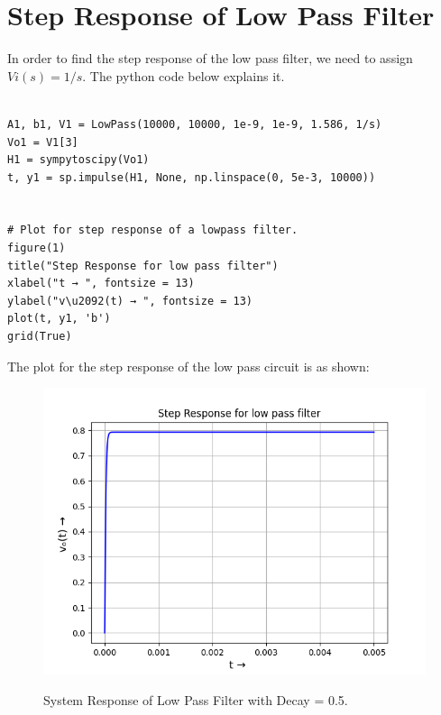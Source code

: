 \documentclass[11pt, a4paper]{article}
\begin{document}
\section*{Step Response of Low Pass Filter}
In order to find the step response of the low pass filter, we need to assign $ Vi(s) = 1/s $. 
The python code below explains it. 
\begin{verbatim}
    
A1, b1, V1 = LowPass(10000, 10000, 1e-9, 1e-9, 1.586, 1/s)
Vo1 = V1[3]
H1 = sympytoscipy(Vo1)
t, y1 = sp.impulse(H1, None, np.linspace(0, 5e-3, 10000))


# Plot for step response of a lowpass filter.
figure(1)
title("Step Response for low pass filter")
xlabel("t → ", fontsize = 13)
ylabel("v\u2092(t) → ", fontsize = 13)
plot(t, y1, 'b')
grid(True)
\end{verbatim}
The plot for the step response of the low pass circuit is as shown:
\begin{figure}[!tbh]
   	\centering
   	\includegraphics[width=1.0\textwidth]{Ass7_Figure_1.png}
   	\label{fig:32}
   	\caption{System Response of Low Pass Filter with Decay = 0.5.}
   \end{figure}
\end{document}
